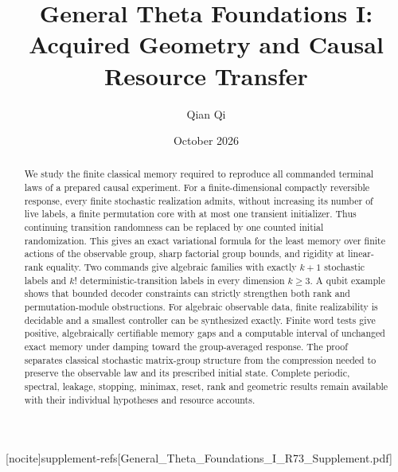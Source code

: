
[nocite]{supplement-refs}[General_Theta_Foundations_I_R73_Supplement.pdf]
\title[Acquired geometry and causal resource transfer]{General Theta Foundations I:\\Acquired Geometry and Causal Resource Transfer}
\author{Qian Qi}\date{October 2026}

\begin{abstract}
We study the finite classical memory required to reproduce all commanded
terminal laws of a prepared causal experiment. For a finite-dimensional
compactly reversible response, every finite stochastic realization admits,
without increasing its number of live labels, a finite permutation core
with at most one transient initializer. Thus continuing transition
randomness can be replaced by one counted initial randomization. This
gives an exact variational formula for the least memory over finite actions
of the observable group, sharp factorial group bounds, and rigidity at
linear-rank equality. Two commands give algebraic families with exactly
$k+1$ stochastic labels and $k!$ deterministic-transition labels in every
dimension $k\ge3$. A qubit example shows that bounded decoder constraints
can strictly strengthen both rank and permutation-module obstructions.
For algebraic observable data, finite realizability is decidable and a
smallest controller can be synthesized exactly. Finite word tests give
positive, algebraically certifiable memory gaps and a computable interval
of unchanged exact memory under damping toward the group-averaged response.
The proof separates classical stochastic matrix-group structure from the
compression needed to preserve the observable law and its prescribed initial
state. Complete periodic, spectral, leakage, stopping, minimax, reset, rank
and geometric results remain available with their individual hypotheses
and resource accounts.
\end{abstract}
\maketitle









